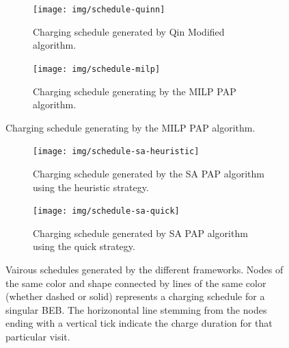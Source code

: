 \documentclass[11pt,a4paper,final]{article}
\begin{document}
\begin{figure}
  \centering
  \begin{subfigure}[t]{\textwidth}
    \centering
    \texttt{[image: img/schedule-quinn]}
    \caption{Charging schedule generated by Qin Modified algorithm.}
    \label{subfig:schedule-quinn}
  \end{subfigure}

  \hfill

  \begin{subfigure}[t]{\textwidth}
    \centering
    \texttt{[image: img/schedule-milp]}
    \caption{Charging schedule generating by the MILP PAP algorithm.}
    \label{subfig:schedule-milp}
  \end{subfigure}
\end{figure}

\begin{figure} \ContinuedFloat
  \centering

  \begin{subfigure}[t]{\textwidth}
    \centering \texttt{[image: img/schedule-sa-heuristic]}
    \caption{Charging schedule generated by the SA PAP algorithm using the heuristic strategy.}
    \label{subfig:schedule-heuristic-sa}
  \end{subfigure}

  \hfill

  \begin{subfigure}[t]{\textwidth}
    \centering \texttt{[image: img/schedule-sa-quick]}
    \caption{Charging schedule generated by SA PAP algorithm using the quick strategy.}
    \label{subfig:schedule-quick-sa}
  \end{subfigure}
  \caption{Vairous schedules generated by the different frameworks. Nodes of the same color and shape connected by lines of the same color (whether dashed or solid) represents a charging schedule for a singular BEB. The horizonontal line stemming from the nodes ending with a vertical tick indicate the charge duration for that particular visit.}
  \label{fig:schedule}
\end{figure}
\end{document}
